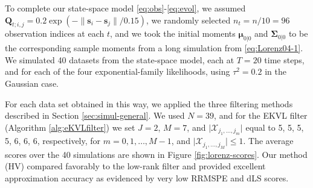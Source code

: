 \documentclass[12pt,letterpaper]{article}
\theoremstyle{propstyle}
\theoremstyle{propstyle}
\theoremstyle{propstyle}
\theoremstyle{propstyle}
\theoremstyle{propstyle}
\newcommand{\bs}{\mathbf{s}}
\newcommand{\bQ}{\mathbf{Q}}
\newcommand{\bfmu}{\bm{\mu}}
\newcommand{\bfSigma}{\bm{\Sigma}}
\newcommand{\sx}{\mathcal{X}}
\newcommand{\jm}{{j_1,\ldots,j_m}}
\newcommand{\jM}{{j_1,\ldots,j_M}}
\newcommand{\todo}[1]{\textcolor{red}{[#1]}}
\begin{document}
To complete our state-space model \eqref{eq:obs}-\eqref{eq:evol}, we assumed $\bQ_{t;i,j} = 0.2 \exp(-\|\bs_i - \bs_j\|/0.15)$, we randomly selected $n_t = n/10 = 96$ observation indices at each $t$, and we took the initial moments $\bfmu_{0|0}$ and $\bfSigma_{0|0}$ to be the corresponding sample moments from a long simulation from \eqref{eq:Lorenz04-1}. We simulated 40 datasets from the state-space model, each at $T=20$ time steps, and for each of the four exponential-family likelihoods, using $\tau^2=0.2$ in the Gaussian case.



For each data set obtained in this way, we applied the three filtering methods described in Section \ref{sec:simul-general}. We used $N=39$, and for the EKVL filter (Algorithm \ref{alg:eKVLfilter}) we set $J=2$, $M=7$, and $\lvert \sx_\jm \rvert$ equal to 5, 5, 5, 5, 6, 6, 6, respectively, for $m=0, 1, \dots, M-1$, and $\lvert \sx_\jM\rvert \leq 1$. The average scores over the 40 simulations are shown in Figure \ref{fig:lorenz-scores}.
Our method (HV) compared favorably to the low-rank filter and provided excellent approximation accuracy as evidenced by very low RRMSPE and dLS scores.
\end{document}
